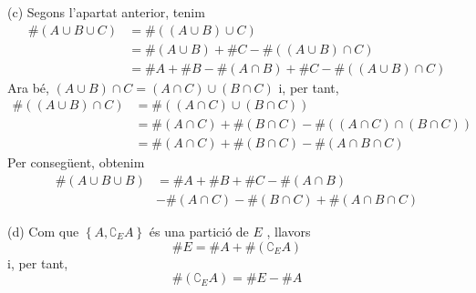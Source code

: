 \begin{solucio}
(c) Segons l'apartat anterior, tenim%
\begin{align*}
\#\left( A\cup B\cup C\right) & =\#\left( (A\cup B)\cup C\right) \\
& =\#(A\cup B)+\#C-\#\left( (A\cup B)\cap C\right) \\
& =\#A+\#B-\#\left( A\cap B\right) +\#C-\#\left( (A\cup B)\cap C\right)
\end{align*}%
Ara b\'{e}, $(A\cup B)\cap C=(A\cap C)\cup (B\cap C)$ i, per tant,%
\begin{align*}
\#\left( (A\cup B)\cap C\right) & =\#\left( (A\cap C)\cup (B\cap C)\right) \\
& =\#\left( A\cap C\right) +\#\left( B\cap C\right) -\#\left( (A\cap C)\cap
(B\cap C)\right) \\
& =\#\left( A\cap C\right) +\#\left( B\cap C\right) -\#\left( A\cap B\cap
C\right)
\end{align*}%
Per conseg\"{u}ent, obtenim%
\begin{align*}
\#\left( A\cup B\cup B\right) & =\#A+\#B+\#C-\#\left( A\cap B\right) \\
& -\#\left( A\cap C\right) -\#\left( B\cap C\right) +\#\left( A\cap B\cap
C\right)
\end{align*}

(d) Com que $\left\{ A,\complement _{E}A\right\} $ \'{e}s una partici\'{o}
de $E$ , llavors%
\begin{equation*}
\#E=\#A+\#\left( \complement _{E}A\right)
\end{equation*}%
i, per tant,
\begin{equation*}
\#\left( \complement _{E}A\right) =\#E-\#A
\end{equation*}


\end{solucio}
